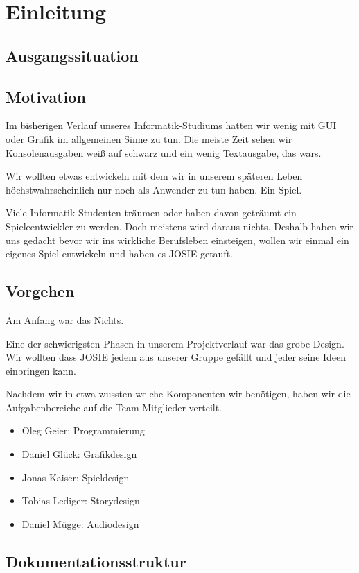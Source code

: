 \chapter{Einleitung}\label{ch:intro}

\section{Ausgangssituation}

\section{Motivation}

Im bisherigen Verlauf unseres Informatik-Studiums hatten wir wenig mit GUI oder Grafik im allgemeinen Sinne zu tun. Die meiste Zeit sehen wir Konsolenausgaben weiß auf schwarz und ein wenig Textausgabe, das wars. 

Wir wollten etwas entwickeln mit dem wir in unserem späteren Leben höchstwahrscheinlich nur noch als Anwender zu tun haben. Ein Spiel. 

Viele Informatik Studenten träumen oder haben davon geträumt ein Spieleentwickler zu werden. Doch meistens wird daraus nichts. Deshalb haben wir uns gedacht bevor wir ins wirkliche Berufsleben einsteigen, wollen wir einmal ein eigenes Spiel entwickeln und haben es JOSIE getauft.

\section{Vorgehen}

Am Anfang war das Nichts.

Eine der schwierigsten Phasen in unserem Projektverlauf war das grobe Design. Wir wollten dass JOSIE jedem aus unserer Gruppe gefällt und jeder seine Ideen einbringen kann.

Nachdem wir in etwa wussten welche Komponenten wir benötigen, haben wir die Aufgabenbereiche auf die Team-Mitglieder verteilt.

\begin{itemize}

\item Oleg Geier: Programmierung

\item Daniel Glück: Grafikdesign

\item Jonas Kaiser: Spieldesign

\item Tobias Lediger: Storydesign

\item Daniel Mügge: Audiodesign

\end{itemize}




\section{Dokumentationsstruktur}



